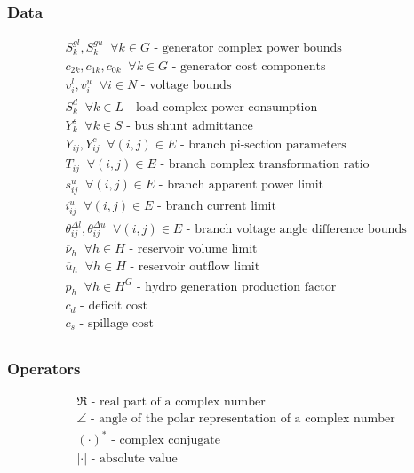 \documentclass{juliacon}
\begin{document}
\subsubsection*{Data}
\begin{align*}
%
& S^{gl}_k, S^{gu}_k \;\; \forall k \in G \nonumber \mbox{ - generator complex power bounds}\\
& c_{2k}, c_{1k}, c_{0k} \;\; \forall k \in G \nonumber  \mbox{ - generator cost components}\\
& v^l_i, v^u_i \;\; \forall i \in N \nonumber \mbox{ - voltage bounds}\\
& S^d_k \;\; \forall k \in L \nonumber \mbox{ - load complex power consumption}\\
& Y^s_{k} \;\; \forall k \in S \nonumber \mbox{ - bus shunt admittance}\\
& Y_{ij}, Y^c_{ij} \;\; \forall (i,j) \in E \nonumber \mbox{ - branch pi-section parameters}\\
& {T}_{ij} \;\; \forall (i,j) \in E \nonumber \mbox{ - branch complex transformation ratio}\\
& s^u_{ij}  \;\; \forall (i,j) \in E \nonumber \mbox{ - branch apparent power limit}\\
& i^u_{ij}  \;\; \forall (i,j) \in E \nonumber \mbox{ - branch current limit}\\
& \theta^{\Delta l}_{ij}, \theta^{\Delta u}_{ij} \;\; \forall (i,j) \in E \nonumber \mbox{ - branch voltage angle difference bounds}\\
& \overline{\nu}_h  \;\; \forall h \in H \nonumber \mbox{ - reservoir volume limit}\\
& \overline{u}_h  \;\; \forall h \in H \nonumber \mbox{ - reservoir outflow limit}\\
& p_h  \;\; \forall h \in H^G \nonumber \mbox{ - hydro generation production factor}\\
& c_{d} \nonumber \mbox{ - deficit cost}\\
& c_{s} \nonumber \mbox{ - spillage cost}\\
%
\end{align*}

\vspace{5mm}

\subsubsection*{Operators}
\begin{align*}
%
& \Re \nonumber \mbox{ - real part of a complex number}\\
& \angle \nonumber \mbox{ - angle of the polar representation of a complex number}\\
& (\cdot)^{*} \nonumber \mbox{ - complex conjugate}\\
& |\cdot| \nonumber \mbox{ - absolute value}\\
%
\end{align*}
\end{document}
